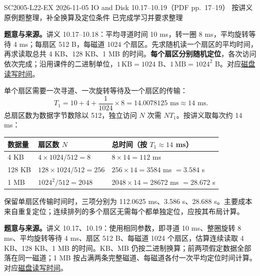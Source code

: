 \begingroup
\renewcommand{\recordid}[1]{}
\renewcommand{\relatedtopic}[2]{\hyperref[topic:#1]{#2}}

\examplemeta
  {SC2005-L22-EX}
  {2026-11-05}
  {IO and Disk 10.17--10.19（PDF pp.~17--19）}
  {按讲义原例题整理，补全换算及定位条件}
  {已完成学习并要求整理}

\linespread{1.15}\selectfont
\setlength{\parskip}{0.4em}

\textbf{题意与来源。}讲义 10.17--10.18：平均寻道时间 10 ms，转一圈 8 ms，平均旋转等待 4 ms；每扇区 512 B，每磁道 1024 个扇区。先求随机读一个扇区的平均时间，再求读取总共 4 KB、128 KB、1 MB 的时间。\textbf{每个扇区分别随机定位}，各次访问依次完成；沿用课件的二进制单位，$1\,\mathrm{KB}=1024$ B、$1\,\mathrm{MB}=1024^2$ B。对应\relatedtopic{SC2005-L22-T04}{磁盘读写时间}。

\begin{workedsolution}
单个扇区需要一次寻道、一次旋转等待及一个扇区的传输：
\[
  T_1=10+4+\frac{1}{1024}\times8
  =14.0078125\text{ ms}\approx14\text{ ms}.
\]
总扇区数为数据字节数除以 512，独立访问 $N$ 次需 $NT_1$。按讲义取每次约 14 ms：
\begin{center}
\begin{tabular}{@{}lll@{}}
\toprule
数据量 & 扇区数 $N$ & 总时间（按 $T_1\approx14$ ms） \\
\midrule
4 KB & $4\times1024/512=8$ & $8\times14=112$ ms \\
128 KB & $128\times1024/512=256$ & $256\times14=3584$ ms $=3.584$ s \\
1 MB & $1024^2/512=2048$ & $2048\times14=28672$ ms $=28.672$ s \\
\bottomrule
\end{tabular}
\end{center}
保留单扇区传输时间时，三项分别为 112.0625 ms、3.586 s、28.688 s。主要成本来自重复定位；连续排列的多个扇区无需每个都单独定位，应按其布局计算。
\end{workedsolution}

\textbf{题意与来源。}讲义 10.17、10.19：使用相同参数，即寻道 10 ms、整圈旋转 8 ms、平均旋转等待 4 ms、扇区 512 B、每磁道 1024 个扇区，估算连续读取 4 KB、128 KB、1 MB 的时间。KB、MB 仍按二进制换算；前两项假定数据全部落在同一磁道；1 MB 按占满两条完整磁道、每磁道各付一次平均定位时间计算。对应\relatedtopic{SC2005-L22-T04}{磁盘读写时间}。

